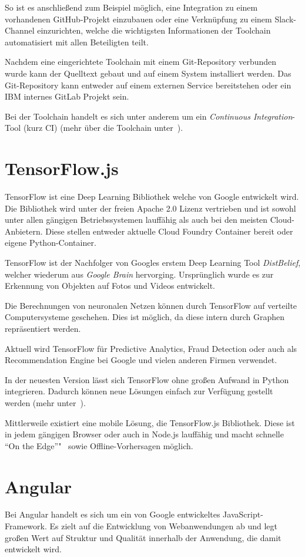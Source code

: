 So ist es anschließend zum Beispiel möglich, eine Integration zu einem vorhandenen GitHub-Projekt einzubauen oder eine
Verknüpfung zu einem Slack-Channel einzurichten, welche die wichtigsten Informationen der Toolchain automatisiert
mit allen Beteiligten teilt.

Nachdem eine eingerichtete Toolchain mit einem Git-Repository verbunden wurde kann der Quelltext gebaut und auf einem
System installiert werden. Das Git-Repository kann entweder auf einem externen Service bereitstehen oder ein IBM
internes GitLab Projekt sein.

Bei der Toolchain handelt es sich unter anderem um ein \textit{Continuous Integration}-Tool (kurz CI)
(mehr über die Toolchain unter~\cite{online_grundlagen_toolchain}).

\section{TensorFlow.js}
TensorFlow ist eine Deep Learning Bibliothek welche von Google entwickelt wird. Die Bibliothek wird unter der freien
Apache 2.0 Lizenz vertrieben und ist sowohl unter allen gängigen Betriebssystemen lauffähig als auch bei den meisten
Cloud-Anbietern. Diese stellen entweder aktuelle Cloud Foundry Container bereit oder eigene Python-Container.

TensorFlow ist der Nachfolger von Googles erstem Deep Learning Tool \textit{DistBelief}, welcher wiederum aus
\textit{Google Brain} hervorging. Ursprünglich wurde es zur Erkennung von Objekten auf Fotos und Videos entwickelt.

Die Berechnungen von neuronalen Netzen können durch TensorFlow auf verteilte Computersysteme geschehen. Dies ist möglich,
da diese intern durch Graphen repräsentiert werden.

Aktuell wird TensorFlow für Predictive Analytics, Fraud Detection oder auch als Recommendation Engine bei Google und
vielen anderen Firmen verwendet.

In der neuesten Version lässt sich TensorFlow ohne großen Aufwand in Python integrieren. Dadurch können neue Lösungen
einfach zur Verfügung gestellt werden (mehr unter~\cite{book_grundlagen_tensorflow}).

Mittlerweile existiert eine mobile Lösung, die TensorFlow.js Bibliothek. Diese ist in jedem gängigen Browser oder auch
in Node.js lauffähig und macht schnelle \enquote{On the Edge}"~ sowie Offline-Vorhersagen möglich.

\section{Angular}
Bei Angular handelt es sich um ein von Google entwickeltes JavaScript-Framework. Es zielt auf die Entwicklung von
Webanwendungen ab und legt großen Wert auf Struktur und Qualität innerhalb der Anwendung, die damit entwickelt wird.

